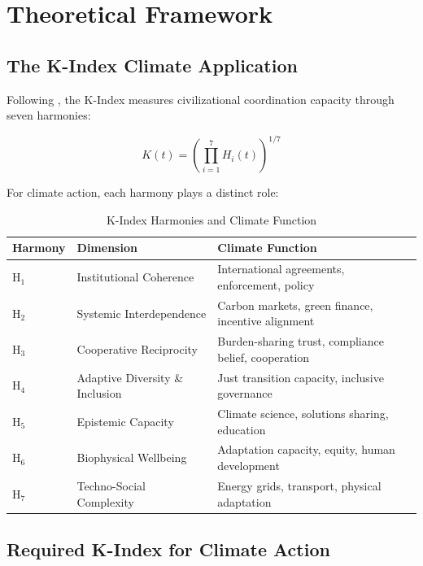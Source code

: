 \documentclass[12pt,a4paper]{article}
\begin{document}
\section{Theoretical Framework}
\label{sec:theory}

\subsection{The K-Index Climate Application}

Following \citet{Paper1}, the K-Index measures civilizational coordination capacity through seven harmonies:

\begin{equation}
K(t) = \left( \prod_{i=1}^{7} H_i(t) \right)^{1/7}
\end{equation}

For climate action, each harmony plays a distinct role:

\begin{table}[H]
\centering
\caption{K-Index Harmonies and Climate Function}
\label{tab:harmonies_climate}
\begin{tabular}{llp{7cm}}
\toprule
\textbf{Harmony} & \textbf{Dimension} & \textbf{Climate Function} \\
\midrule
H$_1$ & Institutional Coherence & International agreements, enforcement, policy \\
H$_2$ & Systemic Interdependence & Carbon markets, green finance, incentive alignment \\
H$_3$ & Cooperative Reciprocity & Burden-sharing trust, compliance belief, cooperation \\
H$_4$ & Adaptive Diversity \& Inclusion & Just transition capacity, inclusive governance \\
H$_5$ & Epistemic Capacity & Climate science, solutions sharing, education \\
H$_6$ & Biophysical Wellbeing & Adaptation capacity, equity, human development \\
H$_7$ & Techno-Social Complexity & Energy grids, transport, physical adaptation \\
\bottomrule
\end{tabular}
\end{table}

\subsection{Required K-Index for Climate Action}
\end{document}
